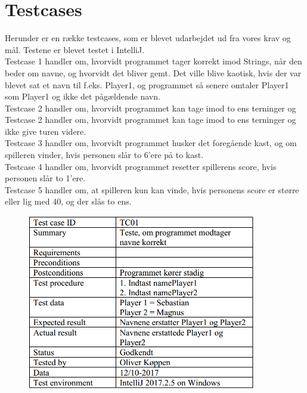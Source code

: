 \section{Testcases}
Herunder er en række testcases, som er blevet udarbejdet ud fra vores krav og mål.
Testene er blevet testet i IntelliJ.
\\Testcase 1 handler om, hvorvidt programmet tager korrekt imod Strings, når den beder om navne, og hvorvidt det bliver gemt.
Det ville blive kaotisk, hvis der var blevet sat et navn til f.eks. Player1, og programmet så senere omtaler Player1 som Player1 og ikke det pågældende navn.
\\Testcase 2 handler om, hvorvidt programmet kan tage imod to ens terninger og Testcase 2 handler om, hvorvidt programmet kan tage imod to ens terninger og ikke give turen videre.
\\Testcase 3 handler om, hvorvidt programmet husker det foregående kast, og om spilleren vinder, hvis personen slår to 6'ere på to kast.
\\Testcase 4 handler om, hvorvidt programmet resetter spillerens score, hvis personen slår to 1'ere.
\\Testcase 5 handler om, at spilleren kun kan vinde, hvis personens score er større eller lig med 40, og der slås to ens.
\begin{figure}[h]
    \begin{center}
        \includegraphics[width=10cm]{graphics/TC01}
    \end{center}
\end{figure}


